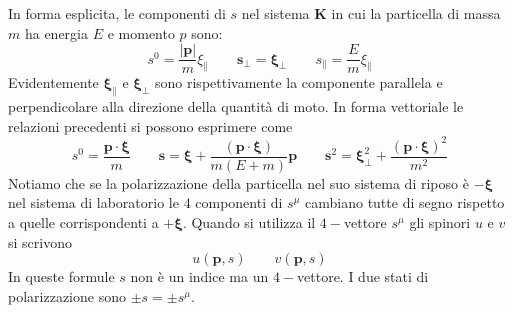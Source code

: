 In forma esplicita, le componenti di $s$ nel sistema $\mathbf{K}$ in cui la particella di massa $m$ ha energia $E$ e momento $p$ sono:
$$
s^0 = \frac{|\mathbf{p}|}{m} \xi_\| \qquad \mathbf{s}_\perp = \boldsymbol{\xi}_\perp \qquad s_\| = \frac{E}{m} \xi_\|
$$
Evidentemente $\boldsymbol{\xi}_\|$ e $\boldsymbol{\xi}_\perp$ sono rispettivamente la componente parallela e perpendicolare alla direzione della quantità di moto. In forma vettoriale le relazioni precedenti si possono esprimere come
$$
s^0 = \frac{\mathbf{p} \cdot \boldsymbol{\xi}}{m} \qquad \mathbf{s} = \boldsymbol{\xi} + \frac{(\mathbf{p} \cdot \boldsymbol{\xi})}{m(E+m)} \mathbf{p} \qquad \mathbf{s}^2 = \boldsymbol{\xi}_\perp^2 + \frac{( \mathbf{p} \cdot \boldsymbol{\xi})^2}{m^2}
$$
Notiamo che se la polarizzazione della particella nel suo sistema di riposo è $-\boldsymbol{\xi}$ nel sistema di laboratorio le $4$ componenti di $s^\mu$ cambiano tutte di segno rispetto a quelle corrispondenti a $+\boldsymbol{\xi}$. Quando si utilizza il $4-$vettore $s^\mu$ gli spinori $u$ e $v$ si scrivono
$$
u(\mathbf{p}, s) \qquad v(\mathbf{p}, s)
$$
In queste formule $s$ non è un indice ma un $4-$vettore. I due stati di polarizzazione sono $\pm s=\pm s^\mu$.
